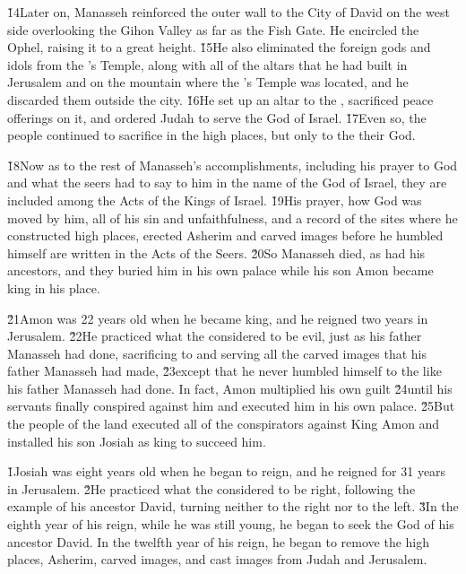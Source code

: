 \v{14}Later on, Manasseh reinforced the outer wall to the City of David on the west side overlooking the Gihon Valley as far as the Fish Gate. He encircled the Ophel, raising it to a great height. \v{15}He also eliminated the foreign gods and idols from the 's Temple, along with all of the altars that he had built in Jerusalem and on the mountain where the 's Temple was located, and he discarded them outside the city. \v{16}He set up an altar to the , sacrificed peace offerings on it, and ordered Judah to serve the  God of Israel. \v{17}Even so, the people continued to sacrifice in the high places, but only to the  their God.

\v{18}Now as to the rest of Manasseh's accomplishments, including his prayer to God and what the seers had to say to him in the name of the  God of Israel, they are included among the Acts of the Kings of Israel. \v{19}His prayer, how God was moved by him, all of his sin and unfaithfulness, and a record of the sites where he constructed high places, erected Asherim and carved images before he humbled himself are written in the Acts of the Seers. \v{20}So Manasseh died, as had his ancestors, and they buried him in his own palace while his son Amon became king in his place.

\v{21}Amon was 22 years old when he became king, and he reigned two years in Jerusalem. \v{22}He practiced what the  considered to be evil, just as his father Manasseh had done, sacrificing to and serving all the carved images that his father Manasseh had made, \v{23}except that he never humbled himself to the  like his father Manasseh had done. In fact, Amon multiplied his own guilt \v{24}until his servants finally conspired against him and executed him in his own palace. \v{25}But the people of the land executed all of the conspirators against King Amon and installed his son Josiah as king to succeed him.

\v{1}Josiah was eight years old when he began to reign, and he reigned for 31 years in Jerusalem. \v{2}He practiced what the  considered to be right, following the example of his ancestor David, turning neither to the right nor to the left. \v{3}In the eighth year of his reign, while he was still young, he began to seek the God of his ancestor David. In the twelfth year of his reign, he began to remove the high places, Asherim, carved images, and cast images from Judah and Jerusalem.

